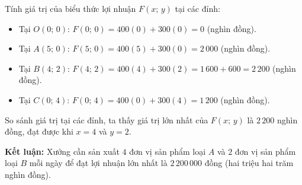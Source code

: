 \documentclass[12pt,a4paper]{article}
\begin{document}
\begin{enumerate}[label=\textbf{Câu \arabic*.},leftmargin=1.1cm]
\begin{enumerate}
    Tính giá trị của biểu thức lợi nhuận $F(x;\, y)$ tại các đỉnh:
    \begin{itemize}
        \item Tại $O(0;\, 0)$: $F(0;\, 0) = 400(0) + 300(0) = 0$ (nghìn đồng).
        \item Tại $A(5;\, 0)$: $F(5;\, 0) = 400(5) + 300(0) = 2\,000$ (nghìn đồng).
        \item Tại $B(4;\, 2)$: $F(4;\, 2) = 400(4) + 300(2) = 1\,600 + 600 = 2\,200$ (nghìn đồng).
        \item Tại $C(0;\, 4)$: $F(0;\, 4) = 400(0) + 300(4) = 1\,200$ (nghìn đồng).
    \end{itemize}
    So sánh giá trị tại các đỉnh, ta thấy giá trị lớn nhất của $F(x;\, y)$ là $2\,200$ nghìn đồng, đạt được khi $x = 4$ và $y = 2$.
    
    \textbf{Kết luận:} Xưởng cần sản xuất $4$ đơn vị sản phẩm loại $A$ và $2$ đơn vị sản phẩm loại $B$ mỗi ngày để đạt lợi nhuận lớn nhất là $2\,200\,000$ đồng (hai triệu hai trăm nghìn đồng).
\end{enumerate}
\end{enumerate}
\end{document}

